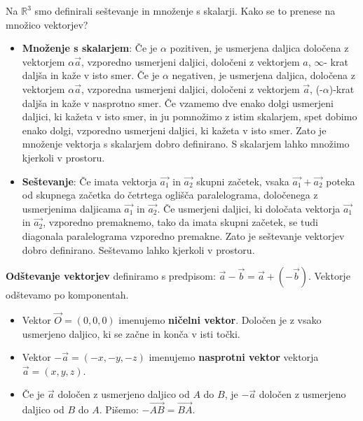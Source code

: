 \documentclass[a4paper,12pt]{article}
\begin{document}
Na $\mathbb{R}^3$ smo definirali seštevanje in množenje s skalarji. Kako se to prenese na množico vektorjev?

\begin{itemize}
\item \textbf{Množenje s skalarjem}: Če je $\alpha$ pozitiven, je usmerjena daljica določena z vektorjem $\alpha \vec{a}$, vzporedno usmerjeni daljici, določeni z vektorjem $a$, $\infty$- krat daljša in kaže v isto smer. Če je $\alpha$ negativen, je usmerjena daljica, določena z vektorjem $\alpha \vec{a}$, vzporedna usmerjeni daljici, določeni z vektorjem $\vec{a}$, (-$\alpha$)-krat daljša in kaže v nasprotno smer. Če vzamemo dve enako dolgi usmerjeni daljici, ki kažeta v isto smer, in ju pomnožimo z istim skalarjem, spet dobimo enako dolgi, vzporedno usmerjeni daljici, ki kažeta v isto smer. Zato je množenje vektorja s skalarjem dobro definirano. S skalarjem lahko množimo kjerkoli v prostoru. \\

\item \textbf{Seštevanje}: Če imata vektorja $\vec{a_1}$ in $\vec{a_2}$ skupni začetek, vsaka $\vec{a_1} + \vec{a_2}$ poteka od \linebreak  skupnega začetka do četrtega oglišča paralelograma, določenega z usmerjenima daljicama $\vec{a_1}$ in $\vec{a_2}$. Če usmerjeni daljici, ki določata vektorja $\vec{a_1}$ in $\vec{a_2}$, vzporedno premaknemo, tako da imata skupni začetek, se tudi diagonala paralelograma vzporedno premakne. Zato je seštevanje vektorjev dobro definirano. Seštevamo lahko kjerkoli v prostoru. \\
\end{itemize}
\newpage
\textbf{Odštevanje vektorjev} definiramo s predpisom: $\vec{a} - \vec{b} = \vec{a} + (- \vec{b})$. Vektorje odštevamo po komponentah. 

\begin{itemize}
\item Vektor $\vec{O} = (0,0,0)$ imenujemo \textbf{ničelni vektor}. Določen je z vsako usmerjeno daljico, ki se začne in konča v isti točki.
\item Vektor $ - \vec{a} = (-x, -y, -z)$ imenujemo \textbf{nasprotni vektor} vektorja $\vec{a}=(x,y,z)$.
\item Če je $\vec{a}$ določen z usmerjeno daljico od $A$ do $B$, je $- \vec{a}$ določen z usmerjeno daljico od $B$ do $A$. Pišemo: $- \overrightarrow{AB} = \overrightarrow{BA}$.\\
\end{itemize}
\end{document}
